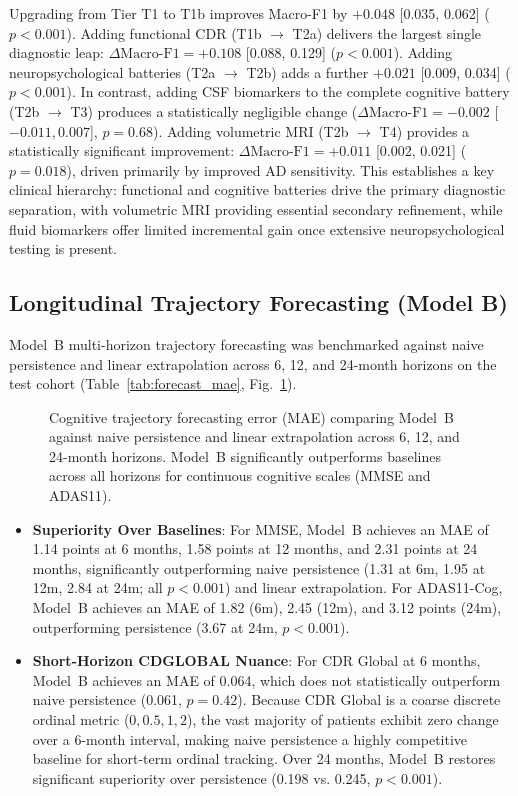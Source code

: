 \documentclass[11pt,a4paper]{article}
\begin{document}
Upgrading from Tier T1 to T1b improves Macro-F1 by $+0.048$ [0.035, 0.062] ($p < 0.001$). Adding functional CDR (T1b $\to$ T2a) delivers the largest single diagnostic leap: $\Delta\text{Macro-F1} = +0.108$ [0.088, 0.129] ($p < 0.001$). Adding neuropsychological batteries (T2a $\to$ T2b) adds a further $+0.021$ [0.009, 0.034] ($p < 0.001$). In contrast, adding CSF biomarkers to the complete cognitive battery (T2b $\to$ T3) produces a statistically negligible change ($\Delta\text{Macro-F1} = -0.002$ [$-0.011, 0.007$], $p = 0.68$). Adding volumetric MRI (T2b $\to$ T4) provides a statistically significant improvement: $\Delta\text{Macro-F1} = +0.011$ [0.002, 0.021] ($p = 0.018$), driven primarily by improved AD sensitivity. This establishes a key clinical hierarchy: functional and cognitive batteries drive the primary diagnostic separation, with volumetric MRI providing essential secondary refinement, while fluid biomarkers offer limited incremental gain once extensive neuropsychological testing is present.

\subsection{Longitudinal Trajectory Forecasting (Model B)}
\label{sec:results_forecasting}
Model~B multi-horizon trajectory forecasting was benchmarked against naive persistence and linear extrapolation across 6, 12, and 24-month horizons on the test cohort (Table~\ref{tab:forecast_mae}, Fig.~\ref{fig:forecast_mae}).



\begin{figure}[t]
\centering
{}
\caption{Cognitive trajectory forecasting error (MAE) comparing Model~B against naive persistence and linear extrapolation across 6, 12, and 24-month horizons. Model~B significantly outperforms baselines across all horizons for continuous cognitive scales (MMSE and ADAS11).}
\label{fig:forecast_mae}
\end{figure}

\begin{itemize}
    \item \textbf{Superiority Over Baselines}: For MMSE, Model~B achieves an MAE of 1.14 points at 6 months, 1.58 points at 12 months, and 2.31 points at 24 months, significantly outperforming naive persistence (1.31 at 6m, 1.95 at 12m, 2.84 at 24m; all $p < 0.001$) and linear extrapolation. For ADAS11-Cog, Model~B achieves an MAE of 1.82 (6m), 2.45 (12m), and 3.12 points (24m), outperforming persistence (3.67 at 24m, $p < 0.001$).
    \item \textbf{Short-Horizon CDGLOBAL Nuance}: For CDR Global at 6 months, Model~B achieves an MAE of 0.064, which does not statistically outperform naive persistence (0.061, $p = 0.42$). Because CDR Global is a coarse discrete ordinal metric ($0, 0.5, 1, 2$), the vast majority of patients exhibit zero change over a 6-month interval, making naive persistence a highly competitive baseline for short-term ordinal tracking. Over 24 months, Model~B restores significant superiority over persistence (0.198 vs. 0.245, $p < 0.001$).
\end{itemize}
\end{document}
